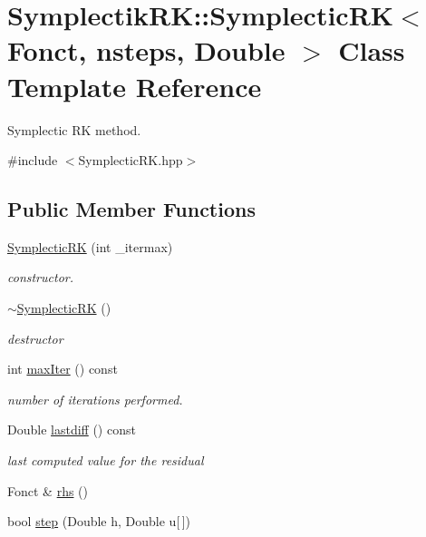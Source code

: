 \hypertarget{classSymplectikRK_1_1SymplecticRK}{\section{Symplectik\-R\-K\-:\-:Symplectic\-R\-K$<$ Fonct, nsteps, Double $>$ Class Template Reference}
\label{classSymplectikRK_1_1SymplecticRK}
}


Symplectic R\-K method.  




{\ttfamily \#include $<$Symplectic\-R\-K.\-hpp$>$}

\subsection*{Public Member Functions}
\begin{DoxyCompactItemize}
\item 
\hyperlink{classSymplectikRK_1_1SymplecticRK_aae9d9e5d3b260a88c734519f0ab662bf}{Symplectic\-R\-K} (int \-\_\-itermax)
\begin{DoxyCompactList}\small\item\em constructor. \end{DoxyCompactList}\item 
\hyperlink{classSymplectikRK_1_1SymplecticRK_a8330526b3f4d12eab97b1937db6a8100}{$\sim$\-Symplectic\-R\-K} ()
\begin{DoxyCompactList}\small\item\em destructor \end{DoxyCompactList}\item 
int \hyperlink{classSymplectikRK_1_1SymplecticRK_a0daa5500d22caa2564528aaeae4ef182}{max\-Iter} () const 
\begin{DoxyCompactList}\small\item\em number of iterations performed. \end{DoxyCompactList}\item 
Double \hyperlink{classSymplectikRK_1_1SymplecticRK_a29bf6fbe240eb63ab92ef1c6245e16e0}{lastdiff} () const 
\begin{DoxyCompactList}\small\item\em last computed value for the residual \end{DoxyCompactList}\item 
Fonct \& \hyperlink{classSymplectikRK_1_1SymplecticRK_afb39f8c5ab13eeea72ec751fcc54302e}{rhs} ()
\item 
bool \hyperlink{classSymplectikRK_1_1SymplecticRK_a630de653e473dbfe146f8ac3712b2c34}{step} (Double h, Double u\mbox{[}$\,$\mbox{]})
\end{DoxyCompactItemize}
